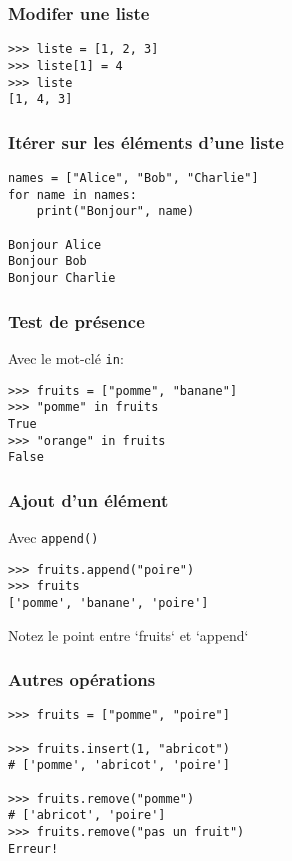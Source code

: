 \documentclass{beamer}
\begin{document}
\begin{frame}[fragile]
  \frametitle{Modifer une liste}
\begin{lstlisting}
>>> liste = [1, 2, 3]
>>> liste[1] = 4
>>> liste
[1, 4, 3]
\end{lstlisting}

\end{frame}

\begin{frame}[fragile]
  \frametitle{Itérer sur les éléments d'une liste}
\begin{lstlisting}
names = ["Alice", "Bob", "Charlie"]
for name in names:
    print("Bonjour", name)

Bonjour Alice
Bonjour Bob
Bonjour Charlie
\end{lstlisting}

\end{frame}

\begin{frame}[fragile]
  \frametitle{Test de présence}

Avec le mot-clé \texttt{in}:

\vfill

\begin{lstlisting}
>>> fruits = ["pomme", "banane"]
>>> "pomme" in fruits
True
>>> "orange" in fruits
False
\end{lstlisting}

\end{frame}

\begin{frame}[fragile]
  \frametitle{Ajout d'un élément}
Avec \texttt{append()}

\begin{lstlisting}
>>> fruits.append("poire")
>>> fruits
['pomme', 'banane', 'poire']
\end{lstlisting}

\vfill

Notez le point entre `fruits` et `append`
\end{frame}


\begin{frame}[fragile]
  \frametitle{Autres opérations}

\begin{lstlisting}
>>> fruits = ["pomme", "poire"]

>>> fruits.insert(1, "abricot")
# ['pomme', 'abricot', 'poire']

>>> fruits.remove("pomme")
# ['abricot', 'poire']
>>> fruits.remove("pas un fruit")
Erreur!
\end{lstlisting}

\end{frame}
\end{document}
